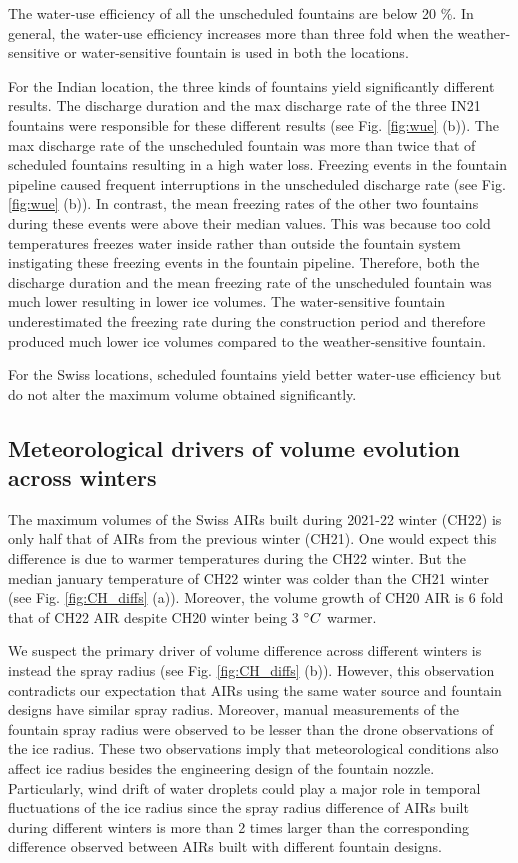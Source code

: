 \documentclass[tc, manuscript]{copernicus}
\begin{document}
The water-use efficiency of all the unscheduled fountains are below 20 \%. In general, the water-use efficiency
increases more than three fold when the weather-sensitive or water-sensitive fountain is used in both the
locations.  

For the Indian location, the three kinds of fountains yield significantly different results.  The discharge
duration and the max discharge rate of the three IN21 fountains were responsible for these different results
(see Fig. \ref{fig:wue} (b)). The max discharge rate of the unscheduled fountain was more than twice that of
scheduled fountains resulting in a high water loss. Freezing events in the fountain pipeline caused frequent
interruptions in the unscheduled discharge rate (see Fig. \ref{fig:wue} (b)). In contrast, the mean freezing
rates of the other two fountains during these events were above their median values. This was because too cold
temperatures freezes water inside rather than outside the fountain system instigating these freezing events in
the fountain pipeline. Therefore, both the discharge duration and the mean freezing rate of the unscheduled
fountain was much lower resulting in lower ice volumes. The water-sensitive fountain underestimated the freezing
rate during the construction period and therefore produced much lower ice volumes compared to the
weather-sensitive fountain. 

For the Swiss locations, scheduled fountains yield better water-use efficiency but do not alter the maximum
volume obtained significantly. 

\subsection{Meteorological drivers of volume evolution across winters}

The maximum volumes of the Swiss AIRs built during 2021-22 winter (CH22) is only half that of AIRs from the
previous winter (CH21). One would expect this difference is due to warmer temperatures during the CH22 winter.
But the median january temperature of CH22 winter was colder than the CH21 winter (see Fig. \ref{fig:CH_diffs}
(a)). Moreover, the volume growth of CH20 AIR is 6 fold that of CH22 AIR despite CH20 winter being 3 $^{\circ} C$
warmer.

We suspect the primary driver of volume difference across different winters is instead the spray radius (see
Fig. \ref{fig:CH_diffs} (b)). However, this observation contradicts our expectation that AIRs using the same
water source and fountain designs have similar spray radius. Moreover, manual measurements of the fountain spray
radius were observed to be lesser than the drone observations of the ice radius. These two observations imply
that meteorological conditions also affect ice radius besides the engineering design of the fountain nozzle.
Particularly, wind drift of water droplets could play a major role in temporal fluctuations of the ice radius
since the spray radius difference of AIRs built during different winters is more than 2 times larger than the
corresponding difference observed between AIRs built with different fountain designs.
\end{document}
